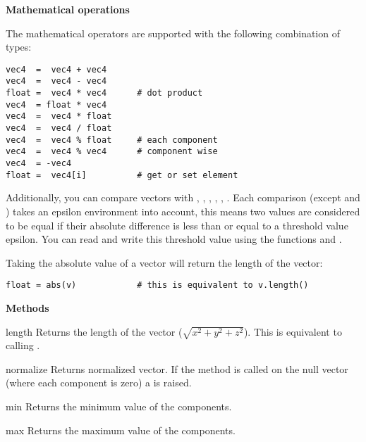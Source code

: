 {\bf Mathematical operations}

The mathematical operators are supported with the following
combination of types:

\begin{verbatim}
vec4  =  vec4 + vec4
vec4  =  vec4 - vec4
float =  vec4 * vec4      # dot product
vec4  = float * vec4
vec4  =  vec4 * float
vec4  =  vec4 / float
vec4  =  vec4 % float     # each component
vec4  =  vec4 % vec4      # component wise
vec4  = -vec4
float =  vec4[i]          # get or set element
\end{verbatim}

Additionally, you can compare vectors with \code{==}, \code{!=}, \code{<}, 
\code{<=}, \code{>}, \code{>=}. Each
comparison (except \code{<} and \code{>}) takes an epsilon environment
into account, this means two values are considered to be equal if
their absolute difference is less than or equal to a threshold value
epsilon. You can read and write this threshold value using the
functions  and .

Taking the absolute value of a vector will return the length of the vector: 

\begin{verbatim}
float = abs(v)            # this is equivalent to v.length()
\end{verbatim}

{\bf Methods}

\begin{methoddesc}{length}{}
Returns the length of the vector ($\sqrt{x^2+y^2+z^2}$). This is
equivalent to calling .
\end{methoddesc}

\begin{methoddesc}{normalize}{}
Returns normalized vector. If the method is called on the null vector
(where each component is zero) a  is raised.
\end{methoddesc}

\begin{methoddesc}{min}{}
Returns the minimum value of the components.
\end{methoddesc}

\begin{methoddesc}{max}{}
Returns the maximum value of the components.
\end{methoddesc}

